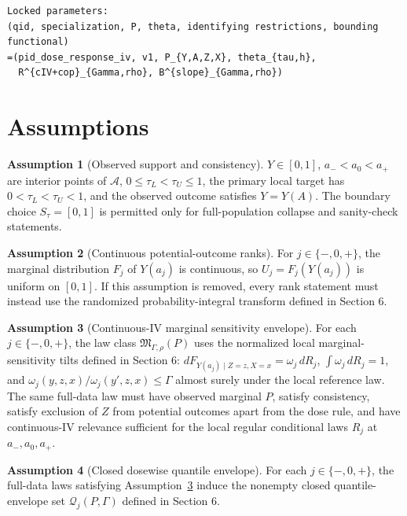 \documentclass[11pt]{article}
\theoremstyle{definition}
\newtheorem{assumption}{Assumption}
\theoremstyle{plain}
\theoremstyle{remark}
\begin{document}
\begin{verbatim}
Locked parameters:
(qid, specialization, P, theta, identifying restrictions, bounding functional)
=(pid_dose_response_iv, v1, P_{Y,A,Z,X}, theta_{tau,h},
  R^{cIV+cop}_{Gamma,rho}, B^{slope}_{Gamma,rho})
\end{verbatim}

\section{Assumptions}
\begin{assumption}[Observed support and consistency]\label{ass:support}
\(Y\in[0,1]\), \(a_-<a_0<a_+\) are interior points of \(\mathcal A\), \(0\le\tau_L<\tau_U\le1\), the primary local target has \(0<\tau_L<\tau_U<1\), and the observed outcome satisfies \(Y=Y(A)\).  The boundary choice \(S_\tau=[0,1]\) is permitted only for full-population collapse and sanity-check statements.
\end{assumption}

\begin{assumption}[Continuous potential-outcome ranks]\label{ass:continuous-ranks}
For \(j\in\{-,0,+\}\), the marginal distribution \(F_j\) of \(Y(a_j)\) is continuous, so \(U_j=F_j(Y(a_j))\) is uniform on \([0,1]\).  If this assumption is removed, every rank statement must instead use the randomized probability-integral transform defined in Section 6.
\end{assumption}

\begin{assumption}[Continuous-IV marginal sensitivity envelope]\label{ass:msm}
For each \(j\in\{-,0,+\}\), the law class \(\mathfrak M_{\Gamma,\rho}(P)\) uses the normalized local marginal-sensitivity tilts defined in Section 6: \(dF_{Y(a_j)\mid Z=z,X=x}=\omega_j\,dR_j\), \(\int\omega_j\,dR_j=1\), and \(\omega_j(y,z,x)/\omega_j(y',z,x)\le\Gamma\) almost surely under the local reference law.  The same full-data law must have observed marginal \(P\), satisfy consistency, satisfy exclusion of \(Z\) from potential outcomes apart from the dose rule, and have continuous-IV relevance sufficient for the local regular conditional laws \(R_j\) at \(a_-,a_0,a_+\).
\end{assumption}

\begin{assumption}[Closed dosewise quantile envelope]\label{ass:civ-envelope}
For each \(j\in\{-,0,+\}\), the full-data laws satisfying Assumption~\ref{ass:msm} induce the nonempty closed quantile-envelope set \(\mathcal Q_j(P,\Gamma)\) defined in Section 6.
\end{assumption}
\end{document}
